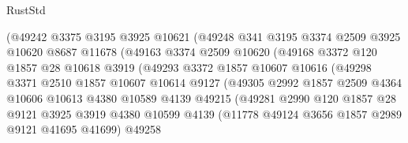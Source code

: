 \begin{lexlean}{RustStd}
\begin{coremodule}
                          (@49242
                            @3375
                            @3195
                            @3925
                            @10621
                            (@49248
                              @341
                              @3195
                              @3374
                              @2509
                              @3925
                              @10620
                              @8687
                              @11678
                              (@49163
                                @3374
                                @2509
                                @10620
                                (@49168
                                  @3372
                                  @120
                                  @1857
                                  @28
                                  @10618
                                  @3919
                                  (@49293
                                    @3372
                                    @1857
                                    @10607
                                    @10616
                                    (@49298
                                      @3371
                                      @2510
                                      @1857
                                      @10607
                                      @10614
                                      @9127
                                      (@49305
                                        @2992
                                        @1857
                                        @2509
                                        @4364
                                        @10606
                                        @10613
                                        @4380
                                        @10589
                                        @4139
                                        @49215
                                        (@49281
                                          @2990
                                          @120
                                          @1857
                                          @28
                                          @9121
                                          @3925
                                          @3919
                                          @4380
                                          @10599
                                          @4139
                                          (@11778 @49124 @3656 @1857 @2989 @9121 @41695 @41699)
                                          @49258

\end{coremodule}
\end{lexlean}
